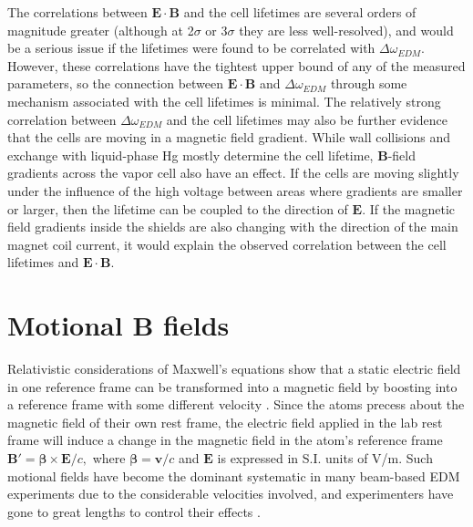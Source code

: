 \documentclass [10pt, twoside] {uwthesis}[2012/04/02]
\begin{document}
The correlations between $\mathbf{E}\cdot\mathbf{B}$ and the cell lifetimes are several orders of magnitude greater (although at 2$\sigma$ or 3$\sigma$ they are less well-resolved), and would be a serious issue if the lifetimes were found to be correlated with $\Delta\omega_{EDM}$. However, these correlations have the tightest upper bound of any of the measured parameters, so the connection between $\mathbf{E}\cdot\mathbf{B}$ and $\Delta\omega_{EDM}$ through some mechanism associated with the cell lifetimes is minimal. The relatively strong correlation between $\Delta\omega_{EDM}$ and the cell lifetimes may also be further evidence that the cells are moving in a magnetic field gradient. While wall collisions and exchange with liquid-phase Hg mostly determine the cell lifetime, $\mathbf{B}$-field gradients across the vapor cell also have an effect. If the cells are moving slightly under the influence of the high voltage between areas where gradients are smaller or larger, then the lifetime can be coupled to the direction of $\mathbf{E}$. If the magnetic field gradients inside the shields are also changing with the direction of the main magnet coil current, it would explain the observed correlation between the cell lifetimes and $\mathbf{E}\cdot\mathbf{B}$.

\section{Motional B fields}
Relativistic considerations of Maxwell's equations show that a static electric field in one reference frame can be transformed into a magnetic field by boosting into a reference frame with some different velocity \cite[11.150]{Jackson}. Since the atoms precess about the magnetic field of their own rest frame, the electric field applied in the lab rest frame will induce a change in the magnetic field in the atom's reference frame $\mathbf{B}' = \mathbf{\beta} \times \mathbf{E}/c,$ where $\mathbf{\beta} = \mathbf{v}/c$ and $\mathbf{E}$ is expressed in S.I. units of V/m. Such motional fields have become the dominant systematic in many beam-based EDM experiments due to the considerable velocities involved, and experimenters have gone to great lengths to control their effects \cite{2002_Tl_EDM}. 
\end{document}
